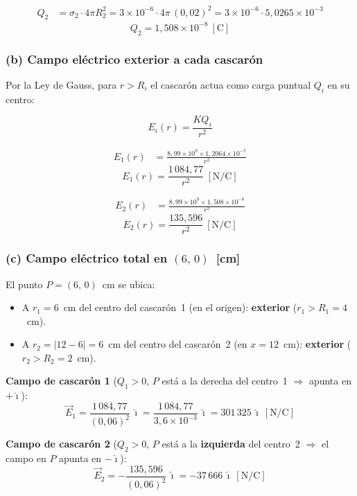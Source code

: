 \documentclass[12pt,letterpaper]{article}
\begin{document}
\begin{align*}
    Q_2 &= \sigma_2 \cdot 4\pi R_2^2
         = 3\times10^{-6} \cdot 4\pi\,(0{,}02)^2
         = 3\times10^{-6} \cdot 5{,}0265\times10^{-3}
\end{align*}
\[
    \boxed{Q_2 = 1{,}508\times10^{-8}\ [\text{C}]}
\]

\subsubsection*{(b) Campo el\'ectrico exterior a cada cascar\'on}

Por la Ley de Gauss, para $r > R_i$ el cascar\'on actua como carga puntual $Q_i$ en su centro:

\[
    E_i(r) = \frac{KQ_i}{r^2}
\]

\begin{align*}
    E_1(r) &= \frac{8{,}99\times10^9 \times 1{,}2064\times10^{-7}}{r^2}
\end{align*}
\[
    \boxed{E_1(r) = \frac{1\,084{,}77}{r^2}\ [\text{N/C}]}
\]

\begin{align*}
    E_2(r) &= \frac{8{,}99\times10^9 \times 1{,}508\times10^{-8}}{r^2}
\end{align*}
\[
    \boxed{E_2(r) = \frac{135{,}596}{r^2}\ [\text{N/C}]}
\]

\subsubsection*{(c) Campo el\'ectrico total en $(6,\,0)$~[cm]}

El punto $P = (6,\,0)$~cm se ubica:
\begin{itemize}
    \item A $r_1 = 6$~cm del centro del cascar\'on~1 (en el origen): \textbf{exterior} ($r_1 > R_1 = 4$~cm).
    \item A $r_2 = |12 - 6| = 6$~cm del centro del cascar\'on~2 (en $x=12$~cm): \textbf{exterior} ($r_2 > R_2 = 2$~cm).
\end{itemize}

\textbf{Campo de cascar\'on 1} ($Q_1 > 0$, $P$ est\'a a la derecha del centro~1 $\Rightarrow$ apunta en $+\hat{\imath}$):
\[
    \vec{E}_1 = \frac{1\,084{,}77}{(0{,}06)^2}\,\hat{\imath}
    = \frac{1\,084{,}77}{3{,}6\times10^{-3}}\,\hat{\imath}
    = 301\,325\,\hat{\imath}\ [\text{N/C}]
\]

\textbf{Campo de cascar\'on 2} ($Q_2 > 0$, $P$ est\'a a la \textbf{izquierda} del centro~2
$\Rightarrow$ el campo en $P$ apunta en $-\hat{\imath}$):
\[
    \vec{E}_2 = -\frac{135{,}596}{(0{,}06)^2}\,\hat{\imath}
    = -37\,666\,\hat{\imath}\ [\text{N/C}]
\]
\end{document}

